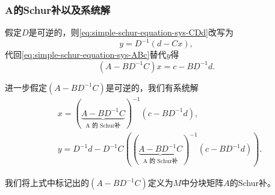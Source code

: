 \begin{subappendices}
\subsubsection{A的Schur补以及系统解}
假定$D$是可逆的，则\eqref{eq:simple-schur-equation-sys-CDd}改写为
\begin{equation*}
  y= D^{-1} \left( d - C x \right),
\end{equation*}
代回\eqref{eq:simple-schur-equation-sys-ABc}替代$y$得
\begin{equation*}
    \left(A-BD^{-1}C\right) x = c - B D^{-1} d.
\end{equation*}

进一步假定$\left(A-BD^{-1}C\right)$是可逆的，我们有系统解
\begin{subequations}
  \begin{align}
    \label{eq:simple-schur-A-solution-x}
    &x = \left(\underbrace{A-BD^{-1}C}_{\text{A 的 Schur补}}\right)^{-1} \left(c - BD^{-1}d\right), \\
    \label{eq:simple-schur-A-solution-y}
    &y=D^{-1} d - D^{-1} C \left( \left(\underbrace{A-BD^{-1}C}_{\text{A 的 Schur补}}\right)^{-1} \left(c - BD^{-1}d\right) \right).
  \end{align}
\end{subequations}

我们将上式中标记出的$\left(A-BD^{-1}C\right)$定义为$M$中分块矩阵$A$的Schur补。


\end{subappendices}
